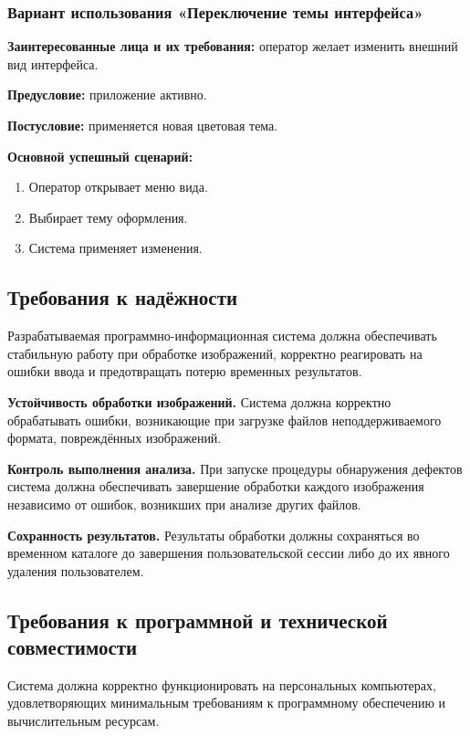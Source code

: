 \subsubsection{Вариант использования «Переключение темы интерфейса»}

\textbf{Заинтересованные лица и их требования:} оператор желает изменить внешний вид интерфейса.

\textbf{Предусловие:} приложение активно.

\textbf{Постусловие:} применяется новая цветовая тема.

\textbf{Основной успешный сценарий:}

\begin{enumerate}
	\item Оператор открывает меню вида.
	\item Выбирает тему оформления.
	\item Система применяет изменения.
\end{enumerate}

\subsection{Требования к надёжности}

Разрабатываемая программно-информационная система должна обеспечивать стабильную работу при обработке изображений, корректно реагировать на ошибки ввода и предотвращать потерю временных результатов.

\textbf{Устойчивость обработки изображений.} Система должна корректно обрабатывать ошибки, возникающие при загрузке файлов неподдерживаемого формата, повреждённых изображений.

\textbf{Контроль выполнения анализа.} При запуске процедуры обнаружения дефектов система должна обеспечивать завершение обработки каждого изображения независимо от ошибок, возникших при анализе других файлов.

\textbf{Сохранность результатов.} Результаты обработки должны сохраняться во временном каталоге до завершения пользовательской сессии либо до их явного удаления пользователем.

\subsection{Требования к программной и технической совместимости}

Система должна корректно функционировать на персональных компьютерах, удовлетворяющих минимальным требованиям к программному обеспечению и вычислительным ресурсам.

